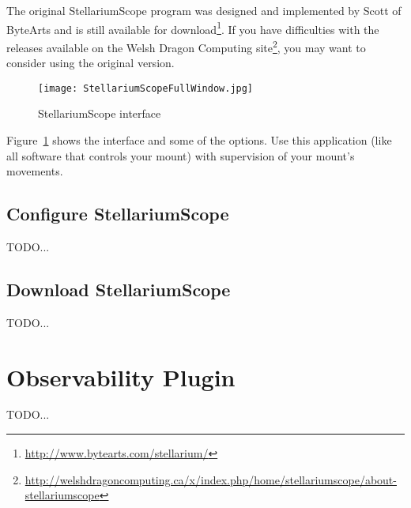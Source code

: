 The original StellariumScope program was designed and implemented by
Scott of ByteArts and is still available for
download\footnote{\url{http://www.bytearts.com/stellarium/}}. If you
have difficulties with the releases available on the Welsh Dragon
Computing
site\footnote{\url{http://welshdragoncomputing.ca/x/index.php/home/stellariumscope/about-stellariumscope}},
you may want to consider using the original version.

\begin{figure}[h]
\begin{center}
\texttt{[image: StellariumScopeFullWindow.jpg]}
\end{center}
\label{fig:StellariumScopeFullWindow}
\caption{StellariumScope interface}
\end{figure}

Figure~\ref{fig:StellariumScopeFullWindow} shows the interface and
some of the options.  Use this application (like all software that
controls your mount) with supervision of your mount's movements.

\subsection{Configure StellariumScope}
\label{sec:plugins:StellariumScope:configure}
TODO...
\subsection{Download StellariumScope}
TODO...


\section{Observability Plugin}
\label{sec:plugins.Observability}

TODO...



